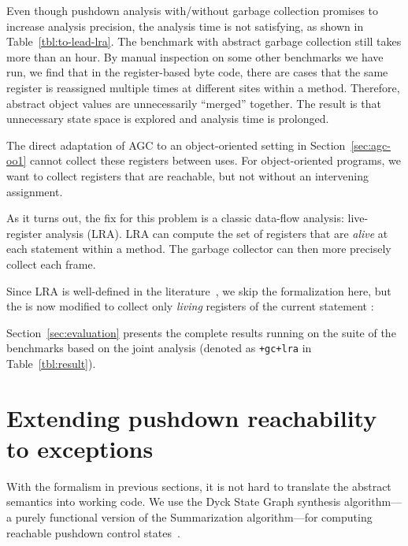 Even though pushdown analysis with/without garbage collection
promises to increase analysis precision, 
the analysis time is not satisfying, 
as shown in Table~\ref{tbl:to-lead-lra}.
The benchmark  with abstract garbage collection still takes more than an hour.
By manual inspection on some other benchmarks we have run, 
we find that 
in the register-based byte code, 
there are cases that the same register is reassigned multiple 
    times at different sites within a method. 
    Therefore, abstract object values are unnecessarily  ``merged'' together.
    The result is that unnecessary state space is explored and analysis time is prolonged.
    
     
    The direct adaptation of AGC to an object-oriented setting in Section~\ref{sec:agc-oo1}
    cannot collect these registers between uses.
For object-oriented programs, we want to collect registers that are reachable, but not without
    an intervening assignment.

    
   
    As it turns out, the fix for this problem 
    is a classic data-flow analysis:
    live-register analysis (LRA).
LRA can compute the set of registers that are \textit{alive} at each statement within a method.
The garbage collector can then more precisely collect each frame.


  Since LRA is well-defined in the literature~\cite{local:new-dragon}, we skip the formalization here, 
  but   
   the   is now modified to collect
      only \textit{living}  registers of the current statement :
      
 
Section~\ref{sec:evaluation} presents the complete results 
running on the suite of the benchmarks based on 
the joint analysis (denoted as {\tt{+gc+lra}} in Table~\ref{tbl:result}).




   

\section{Extending pushdown reachability to exceptions} \label{sec:impl}
With the formalism in previous sections, 
it is not hard to translate the abstract semantics into working code.
We use the Dyck State Graph synthesis algorithm---a purely functional 
version of the Summarization algorithm---for 
computing reachable pushdown control states~\cite{Earl:2012:IPDCFA}.





